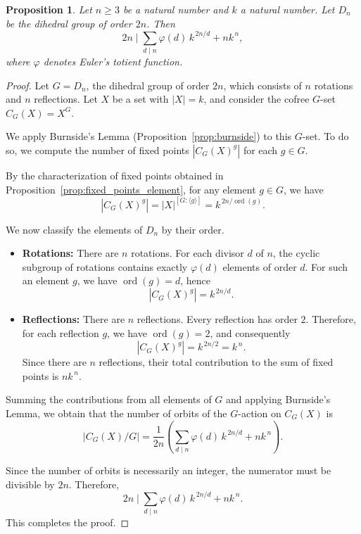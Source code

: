 \documentclass[10pt,a4paper]{amsart}
\newtheorem{proposition}{Proposition}
\begin{document}
\begin{proposition}\label{prop:dihedral_congruence}
Let $n \ge 3$ be a natural number and $k$ a natural number. Let $D_n$ be the dihedral group of order $2n$. Then
\[
2n \mid \sum_{d \mid n} \varphi(d)\, k^{\,2n/d} + n k^{\,n},
\]
where $\varphi$ denotes Euler's totient function.
\end{proposition}

\begin{proof}
Let $G = D_n$, the dihedral group of order $2n$, which consists of $n$ rotations and $n$ reflections. Let $X$ be a set with $|X| = k$, and consider the cofree $G$-set $C_G(X) = X^G$.

We apply Burnside's Lemma (Proposition~\ref{prop:burnside}) to this $G$-set. To do so, we compute the number of fixed points $|C_G(X)^g|$ for each $g \in G$.

By the characterization of fixed points obtained in Proposition~\ref{prop:fixed_points_element}, for any element $g \in G$, we have
\[
\left\lvert C_G(X)^g \right\rvert = |X|^{[G : \langle g \rangle]} = k^{\, 2n / \operatorname{ord}(g)}.
\]

We now classify the elements of $D_n$ by their order.

\begin{itemize}
\item \textbf{Rotations:} There are $n$ rotations. For each divisor $d$ of $n$, the cyclic subgroup of rotations contains exactly $\varphi(d)$ elements of order $d$. For such an element $g$, we have $\operatorname{ord}(g) = d$, hence
\[
\left\lvert C_G(X)^g \right\rvert = k^{\, 2n / d}.
\]

\item \textbf{Reflections:} There are $n$ reflections. Every reflection has order $2$. Therefore, for each reflection $g$, we have $\operatorname{ord}(g) = 2$, and consequently
\[
\left\lvert C_G(X)^g \right\rvert = k^{\, 2n / 2} = k^{\, n}.
\]
Since there are $n$ reflections, their total contribution to the sum of fixed points is $n k^{\, n}$.
\end{itemize}

Summing the contributions from all elements of $G$ and applying Burnside's Lemma, we obtain that the number of orbits of the $G$-action on $C_G(X)$ is
\[
\left\lvert C_G(X) / G \right\rvert
= \frac{1}{2n}
\left( \sum_{d \mid n} \varphi(d)\, k^{\, 2n/d} + n k^{\, n} \right).
\]

Since the number of orbits is necessarily an integer, the numerator must be divisible by $2n$. Therefore,
\[
2n \mid \sum_{d \mid n} \varphi(d)\, k^{\, 2n/d} + n k^{\, n}.
\]
This completes the proof.
\end{proof}
\end{document}
